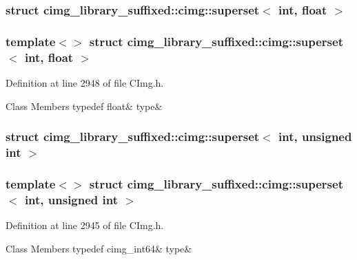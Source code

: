\subsubsection{struct cimg\+\_\+library\+\_\+suffixed\+:\+:cimg\+:\+:superset$<$ int, float $>$}
\subsubsection*{template$<$$>$\newline
struct cimg\+\_\+library\+\_\+suffixed\+::cimg\+::superset$<$ int, float $>$}



Definition at line 2948 of file C\+Img.\+h.

\begin{DoxyFields}{Class Members}
\mbox{\label{namespacecimg__library__suffixed_1_1cimg_aef3af5c5516d697a44b97506d350d3ce}} 
typedef float&
type&
\\
\hline

\end{DoxyFields}
\label{structcimg__library__suffixed_1_1cimg_1_1superset_3_01int_00_01unsigned_01int_01_4}
\subsubsection{struct cimg\+\_\+library\+\_\+suffixed\+:\+:cimg\+:\+:superset$<$ int, unsigned int $>$}
\subsubsection*{template$<$$>$\newline
struct cimg\+\_\+library\+\_\+suffixed\+::cimg\+::superset$<$ int, unsigned int $>$}



Definition at line 2945 of file C\+Img.\+h.

\begin{DoxyFields}{Class Members}
\mbox{\label{namespacecimg__library__suffixed_1_1cimg_a9c7c85ec59bcc6a30ccf39630833c112}} 
typedef cimg\_int64&
type&
\\
\hline

\end{DoxyFields}
\label{structcimg__library__suffixed_1_1cimg_1_1superset_3_01short_00_01cimg__int64_01_4}
